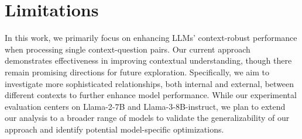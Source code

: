 \section{Limitations}
In this work, we primarily focus on enhancing LLMs' context-robust performance when processing single context-question pairs. Our current approach demonstrates effectiveness in improving contextual understanding, though there remain promising directions for future exploration. Specifically, we aim to investigate more sophisticated relationships, both internal and external, between different contexts to further enhance model performance. While our experimental evaluation centers on Llama-2-7B and Llama-3-8B-instruct, we plan to extend our analysis to a broader range of models to validate the generalizability of our approach and identify potential model-specific optimizations.



